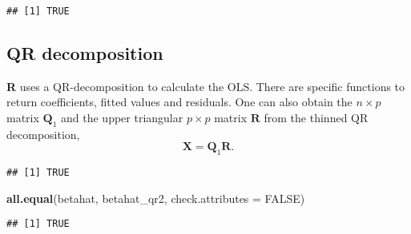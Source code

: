 \documentclass[]{book}
\newenvironment{Shaded}{\begin{snugshade}}{\end{snugshade}}
\newcommand{\KeywordTok}[1]{\textcolor[rgb]{0.13,0.29,0.53}{\textbf{#1}}}
\newcommand{\DataTypeTok}[1]{\textcolor[rgb]{0.13,0.29,0.53}{#1}}
\newcommand{\StringTok}[1]{\textcolor[rgb]{0.31,0.60,0.02}{#1}}
\newcommand{\CommentTok}[1]{\textcolor[rgb]{0.56,0.35,0.01}{\textit{#1}}}
\newcommand{\OtherTok}[1]{\textcolor[rgb]{0.56,0.35,0.01}{#1}}
\newcommand{\OperatorTok}[1]{\textcolor[rgb]{0.81,0.36,0.00}{\textbf{#1}}}
\newcommand{\NormalTok}[1]{#1}
\theoremstyle{definition}
\theoremstyle{definition}
\theoremstyle{definition}
\theoremstyle{remark}
\begin{document}
\begin{verbatim}
## [1] TRUE
\end{verbatim}

\subsection{QR decomposition}\label{qr-decomposition}

\textbf{R} uses a QR-decomposition to calculate the OLS. There are
specific functions to return coefficients, fitted values and residuals.
One can also obtain the \(n \times p\) matrix \(\mathbf{Q}_1\) and the
upper triangular \(p \times p\) matrix \(\mathbf{R}\) from the thinned
QR decomposition, \[\mathbf{X} = \mathbf{Q}_1\mathbf{R}.\]

\begin{Shaded}
\end{Shaded}

\begin{verbatim}
## [1] TRUE
\end{verbatim}

\begin{Shaded}
\begin{Highlighting}[]
\KeywordTok{all.equal}\NormalTok{(betahat, betahat_qr2, }\DataTypeTok{check.attributes =} \OtherTok{FALSE}\NormalTok{)}
\end{Highlighting}
\end{Shaded}

\begin{verbatim}
## [1] TRUE
\end{verbatim}

\begin{Shaded}
\end{Shaded}
\end{document}
